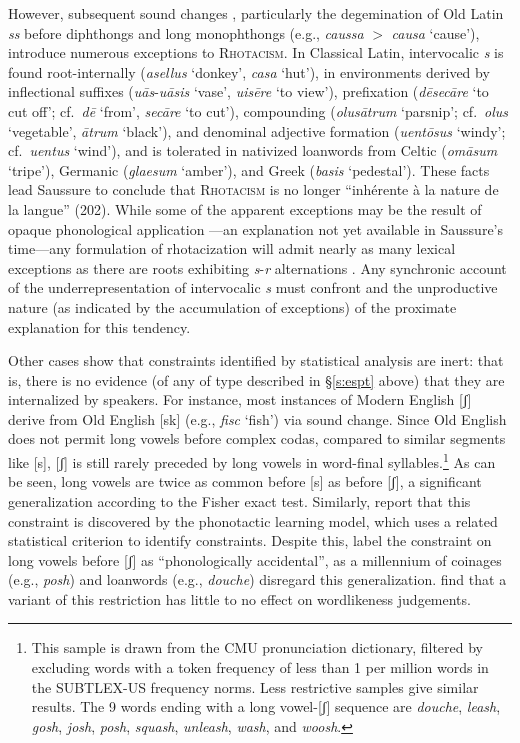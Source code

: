 \noindent
However, subsequent sound changes \citep[e.g.,][]{Baldi1994,Safarewicz1932}, particularly the degemination of Old Latin \emph{ss} before diphthongs and long monophthongs (e.g., \emph{caussa} $>$ \emph{causa} `cause'), introduce numerous exceptions to \textsc{Rhotacism}.
In Classical Latin, intervocalic \emph{s} is found root-internally (\emph{asellus} `donkey', \emph{casa} `hut'), in environments derived by inflectional suffixes (\emph{uās}-\emph{uāsis} `vase', \emph{uisēre} `to view'), prefixation (\emph{dēsecāre} `to cut off'; cf.~\emph{dē} `from', \emph{secāre} `to cut'), compounding (\emph{olusātrum} `parsnip'; cf.~\emph{olus} `vegetable', \emph{ātrum} `black'), and denominal adjective formation (\emph{uentōsus} `windy'; cf.~\emph{uentus} `wind'), and is tolerated in nativized loanwords from Celtic (\emph{omāsum} `tripe'), Germanic (\emph{glaesum} `amber'), and Greek (\emph{basis} `pedestal').
These facts lead Saussure to conclude that \textsc{Rhotacism} is no longer ``inhérente à la nature de la langue'' (202).
While some of the apparent exceptions may be the result of opaque phonological application \citep{Heslin1987}---an explanation not yet available in Saussure's time---any formulation of rhotacization will admit nearly as many lexical exceptions as there are roots exhibiting \emph{s}-\emph{r} alternations \citep{GormanInPressc}.
Any synchronic account of the underrepresentation of intervocalic \emph{s} must confront and the unproductive nature (as indicated by the accumulation of exceptions) of the proximate explanation for this tendency.

Other cases show that constraints identified by statistical analysis are inert: that is, there is no evidence (of any of type described in \S\ref{s:espt} above) that they are internalized by speakers.
For instance, most instances of Modern English [ʃ] derive from Old English [sk] (e.g., \emph{fisc} `fish') via sound change.
Since Old English does not permit long vowels before complex codas, compared to similar segments like [s], [ʃ] is still rarely preceded by long vowels in word-final syllables.\footnote{
    This sample is drawn from the CMU pronunciation dictionary, filtered by excluding words with a token frequency of less than 1 per million words in the SUBTLEX-US frequency norms.
    Less restrictive samples give similar results.
    The 9 words ending with a long vowel-[ʃ] sequence are \emph{douche}, \emph{leash}, \emph{gosh}, \emph{josh}, \emph{posh}, \emph{squash}, \emph{unleash}, \emph{wash}, and \emph{woosh}.}
As can be seen, long vowels are twice as common before [s] as before [ʃ], a significant generalization according to the Fisher exact test.
Similarly, \citet{HayesInPress} report that this constraint is discovered by the \citet{Hayes2008a} phonotactic learning model, which uses a related statistical criterion to identify constraints.
Despite this, \citet{Iverson2005} label the constraint on long vowels before [ʃ] as ``phonologically accidental'', as a millennium of coinages (e.g., \emph{posh}) and loanwords (e.g., \emph{douche}) disregard this generalization.
\citet{HayesInPress} find that a variant of this restriction has little to no effect on wordlikeness judgements.

